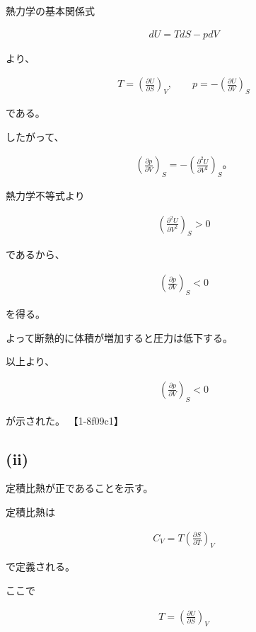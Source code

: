 \documentclass[platex,dvipdfmx,a4paper]{jsarticle}
\begin{document}
熱力学の基本関係式

\begin{align*}
dU
=
TdS-pdV
\end{align*}

より、

\begin{align*}
T
=
\left(
\frac{\partial U}{\partial S}
\right)_V,
\qquad
p
=
-\left(
\frac{\partial U}{\partial V}
\right)_S
\end{align*}

である。

したがって、

\begin{align*}
\left(
\frac{\partial p}{\partial V}
\right)_S
=
-
\left(
\frac{\partial^2U}{\partial V^2}
\right)_S。
\end{align*}

熱力学不等式より

\begin{align*}
\left(
\frac{\partial^2U}{\partial V^2}
\right)_S
>0
\end{align*}

であるから、

\begin{align*}
\left(
\frac{\partial p}{\partial V}
\right)_S
<0
\end{align*}

を得る。

よって断熱的に体積が増加すると圧力は低下する。

以上より、

\begin{align*}
\left(
\frac{\partial p}{\partial V}
\right)_S
<0
\end{align*}

が示された。 【1-8f09c1】

\subsection{(ii)}

定積比熱が正であることを示す。

定積比熱は

\begin{align*}
C_V
=
T
\left(
\frac{\partial S}{\partial T}
\right)_V
\end{align*}

で定義される。

ここで

\begin{align*}
T
=
\left(
\frac{\partial U}{\partial S}
\right)_V
\end{align*}
\end{document}
